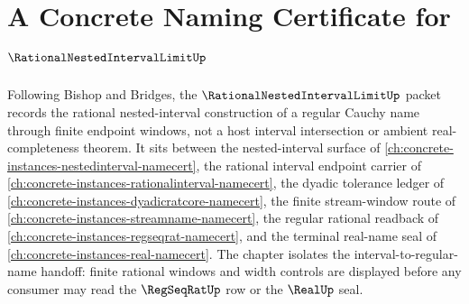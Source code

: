 \chapter{A Concrete Naming Certificate for $\RationalNestedIntervalLimitUp$}
\label{ch:concrete-instances-rational-nested-interval-limit-namecert}

Following Bishop and Bridges, the $\RationalNestedIntervalLimitUp$ packet records the rational nested-interval construction of a regular Cauchy name through finite endpoint windows, not a host interval intersection or ambient real-completeness theorem. It sits between the nested-interval surface of \autoref{ch:concrete-instances-nestedinterval-namecert}, the rational interval endpoint carrier of \autoref{ch:concrete-instances-rationalinterval-namecert}, the dyadic tolerance ledger of \autoref{ch:concrete-instances-dyadicratcore-namecert}, the finite stream-window route of \autoref{ch:concrete-instances-streamname-namecert}, the regular rational readback of \autoref{ch:concrete-instances-regseqrat-namecert}, and the terminal real-name seal of \autoref{ch:concrete-instances-real-namecert}. The chapter isolates the interval-to-regular-name handoff: finite rational windows and width controls are displayed before any consumer may read the $\RegSeqRatUp$ row or the $\RealUp$ seal.

